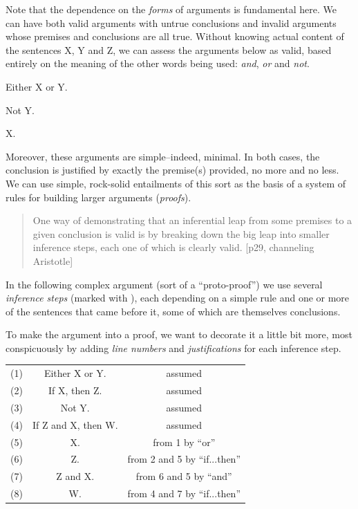 Note that the dependence on the \emph{forms} of arguments is fundamental here.
We can have both valid arguments with untrue conclusions and invalid arguments
whose premises and conclusions are all true. Without knowing actual content
of the sentences X, Y and Z, we can assess the arguments below as valid, based
entirely on the meaning of the other words being used: \emph{and}, \emph{or}
and \emph{not}.

 {
  \begin{argument}
  \item[] Either X or Y.
  \item[] Not Y.
  \item[\therefore] X.
  \end{argument}
}

Moreover, these arguments are simple--indeed, minimal. In both cases, the
conclusion is justified by exactly the premise(s) provided, no more and no
less. We can use simple, rock-solid entailments of this sort as the basis of
a system of rules for building larger arguments (\emph{proofs}).

\begin{quote}
  One way of demonstrating that an inferential leap from some premises to a
  given conclusion is valid is by breaking down the big leap into smaller
  inference steps, each one of which is clearly valid.
  \cite{Smi20}[p29, channeling Aristotle]
\end{quote}

In the following complex argument (sort of a ``proto-proof'') we use several
\emph{inference steps} (marked with \therefore), each depending on a simple
rule and one or more of the sentences that came before it, some of which are
themselves conclusions.

To make the argument into a proof, we want to decorate it a little bit more,
most conspicuously by adding \emph{line numbers} and \emph{justifications} for
each inference step.

\begin{center}
  \begin{tabular}{c c c}
    (1) & Either X or Y.         & assumed                       \\
    (2) & If X, then Z.          & assumed                       \\
    (3) & Not Y.                 & assumed                       \\
    (4) & If Z and X, then W.    & assumed                       \\
    (5) & X.                     & from 1 by ``or''              \\
    (6) & Z.                     & from 2 and 5 by ``if...then'' \\
    (7) & Z and X.               & from 6 and 5 by ``and''       \\
    (8) & W.                     & from 4 and 7 by ``if...then''
  \end{tabular}
\end{center}


